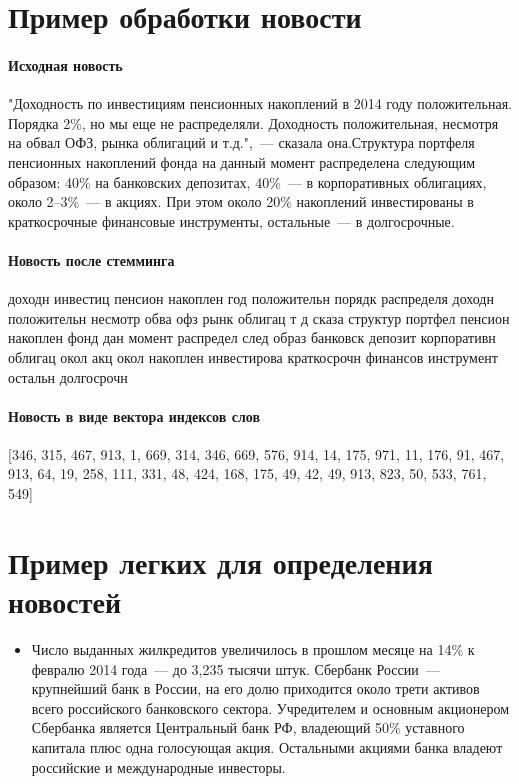 \documentclass[14pt]{matmex-diploma-custom}
\begin{document}
\begin{appendices}
\section{Пример обработки новости}

\label{news:example}

\paragraph{Исходная новость}

"Доходность по инвестициям пенсионных накоплений в 2014 году положительная. Порядка 2\%, но мы еще не распределяли. Доходность положительная, несмотря на обвал ОФЗ, рынка облигаций и т.д.",~--- сказала она.Структура портфеля пенсионных накоплений фонда на данный момент распределена следующим образом: 40\% на банковских депозитах, 40\%~--- в корпоративных облигациях, около 2--3\%~--- в акциях. При этом около 20\% накоплений инвестированы в краткосрочные финансовые инструменты, остальные~--- в долгосрочные.

\paragraph{Новость после стемминга}

доходн инвестиц пенсион накоплен год положительн порядк распределя доходн положительн несмотр обва офз рынк облигац т д сказа структур портфел пенсион накоплен фонд дан момент распредел след образ банковск депозит корпоративн облигац окол акц окол накоплен инвестирова краткосрочн финансов инструмент остальн долгосрочн

\paragraph{Новость в виде вектора индексов слов}

[346, 315, 467, 913, 1, 669, 314, 346, 669, 576, 914, 14, 175, 971, 11, 176, 91, 467, 913, 64, 19, 258, 111, 331, 48, 424, 168, 175, 49, 42, 49, 913, 823, 50, 533, 761, 549]

\section{Пример легких для определения новостей}

\label{news:good}

\begin{itemize}
\item Число выданных жилкредитов увеличилось в прошлом месяце на 14\% к февралю 2014 года~--- до 3,235 тысячи штук. Сбербанк России~--- крупнейший банк в России, на его долю приходится около трети активов всего российского банковского сектора. Учредителем и основным акционером Сбербанка является Центральный банк РФ, владеющий 50\% уставного капитала плюс одна голосующая акция. Остальными акциями банка владеют российские и международные инвесторы.


\end{itemize}
\end{appendices}
\end{document}
